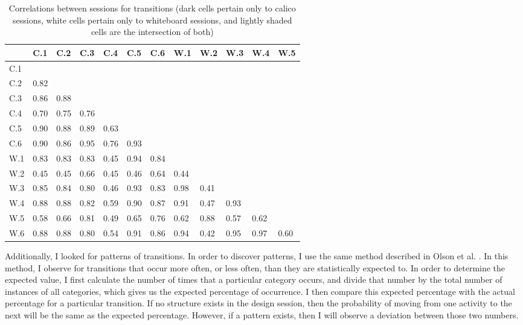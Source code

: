 \begin{table}
\centering
\caption{Correlations between sessions for transitions (dark cells pertain only to calico sessions, white cells pertain only to whiteboard sessions, and lightly shaded cells are the intersection of both)}
\begin{tabular}{ p{0.5cm}p{0.5cm}p{0.5cm}p{0.5cm}p{0.5cm}p{0.5cm}p{0.5cm}p{0.5cm}p{0.5cm}p{0.5cm}p{0.5cm}p{0.5cm}}
\toprule
&	C.1 &	C.2 &	C.3 &	C.4 &	C.5 &	C.6 &	W.1 &	W.2 &	W.3 &	W.4 &	W.5 \\
\midrule
C.1 	 & & & & & & & & & & & 								 \\
C.2 & 	0.82 & & & & & & & & & &								\\		
C.3 & 	0.86 &	0.88 & & & & & & & & & 							 \\		
C.4 & 	0.70 &	0.75 &	0.76 & & & & & & & &							\\	
C.5 & 	0.90 &	0.88 &	0.89 &	0.63 &	 & & & & & &						\\
C.6 & 	0.90 &	0.86 &	0.95 &	0.76 &	0.93 & & & & & &					\\	
W.1 &	0.83 &	0.83 &	0.83 &	0.45 &	0.94 &	0.84 & & & & &				\\	
W.2 &	0.45 &	0.45 &	0.66 &	0.45 &	0.46 &	0.64 &	0.44 & & & &				\\
W.3 &	0.85 &	0.84 &	0.80 &	0.46 &	0.93 &	0.83 &	0.98 &	0.41 & & &			\\
W.4 &	0.88 &	0.88 &	0.82 &	0.59 &	0.90 &	0.87 &	0.91 &	0.47 &	0.93 & &		\\
W.5 &	0.58 &	0.66 &	0.81 &	0.49 &	0.65 &	0.76 &	0.62 &	0.88 &	0.57 &	0.62 &		\\
W.6 &	0.88 &	0.88 &	0.80 &	0.54 &	0.91 &	0.86 &	0.94 &	0.42 &	0.95 &	0.97 &	0.60	\\
\bottomrule
\end{tabular}
\label{table:4}
\end{table}

Additionally, I looked for patterns of transitions. In order to discover patterns, I use the same method described in Olson et al. \citep{Olsona}. In this method, I observe for transitions that occur more often, or less often, than they are statistically expected to. In order to determine the expected value, I first calculate the number of times that a particular category occurs, and divide that number by the total number of instances of all categories, which gives us the expected percentage of occurrence. I then compare this expected percentage with the actual percentage for a particular transition. If no structure exists in the design session, then the probability of moving from one activity to the next will be the same as the expected percentage. However, if a pattern exists, then I will observe a deviation between those two numbers.

